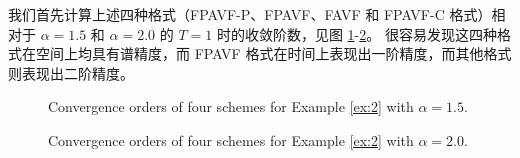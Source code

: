 	我们首先计算上述四种格式（FPAVF-P、FPAVF、FAVF 和 FPAVF-C 格式）相对于 $\alpha=1.5$ 和 $\alpha=2.0$ 的 $T=1$ 时的收敛阶数，见图 \ref{fig:1}-\ref{fig:2}。
	很容易发现这四种格式在空间上均具有谱精度，而 FPAVF 格式在时间上表现出一阶精度，而其他格式则表现出二阶精度。
	

	\begin{figure}[H]
		\begin{center}
		\caption{Convergence orders of four schemes for Example \ref{ex:2} with $\alpha=1.5$.} \label{fig:1}
		\end{center}
		\end{figure}
		
		\begin{figure}[H]
		\begin{center}
		\caption{Convergence orders of four schemes for Example \ref{ex:2} with $\alpha=2.0$.} \label{fig:2}
		\end{center}
		\end{figure}

